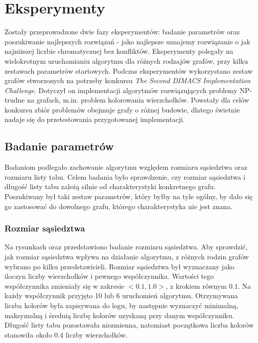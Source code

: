 \documentclass[12pt,a4paper]{article}
\begin{document}
\section{Eksperymenty}
Zostały przeprowadzone dwie fazy eksperymentów: badanie parametrów oraz poszukiwanie najlepszych rozwiązań - jako najlepsze uznajemy rozwiązanie o jak najniższej liczbie chromatycznej bez konfliktów. Eksperymenty polegały na wielokrotnym uruchamianiu algorytmu dla różnych rodzajów grafów, przy kilku zestawach parametrów startowych. Podczas eksperymentów wykorzystano zestaw grafów stworzonych na potrzeby konkursu \textit{The Second DIMACS Implementation Challenge}\cite{Johnson}. Dotyczył on implementacji algorytmów rozwiązujących problemy NP-trudne na grafach, m.in. problem kolorowania wierzchołków. Powstały dla celów konkursu zbiór problemów obejmuje grafy o różnej budowie, dlatego świetnie nadaje się do przetestowania przygotowanej implementacji. 

\subsection{Badanie parametrów}
Badaniom podlegało zachowanie algorytmu względem rozmiaru sąsiedztwa oraz rozmiaru listy tabu. Celem badania było sprawdzenie, czy rozmiar sąsiedztwa i długość listy tabu zależą silnie od charakterystyki konkretnego grafu. Poszukiwany był taki zestaw parametrów, który byłby na tyle ogólny, by dało się go zastosować do dowolnego grafu, którego charakterystyka nie jest znana. 

\subsubsection{Rozmiar sąsiedztwa}
Na rysunkach  oraz  przedstawiono badanie rozmiaru sąsiedztwa. Aby sprawdzić, jak rozmiar sąsiedztwa wpływa na działanie algorytmu, z różnych rodzin grafów wybrano po kilku przedstawicieli. Rozmiar sąsiedztwa był wyznaczany jako iloczyn liczby wierzchołków i pewnego współczynnika. Wartości tego współczynnika zmieniały się w zakresie $<0.1, 1.0>$, z krokiem równym $0.1$. Na każdy współczynnik przyjęto 10 lub 6 uruchomień algorytmu. Otrzymywana liczba kolorów była zapisywana do logu, by następnie wyznaczyć minimalną, maksymalną i średnią liczbę kolorów uzyskaną przy danym współczynniku. Długość listy tabu pozostawała niezmienna, natomiast początkowa liczba kolorów stanowiła około $0.4$ liczby wierzchołków.
\end{document}
